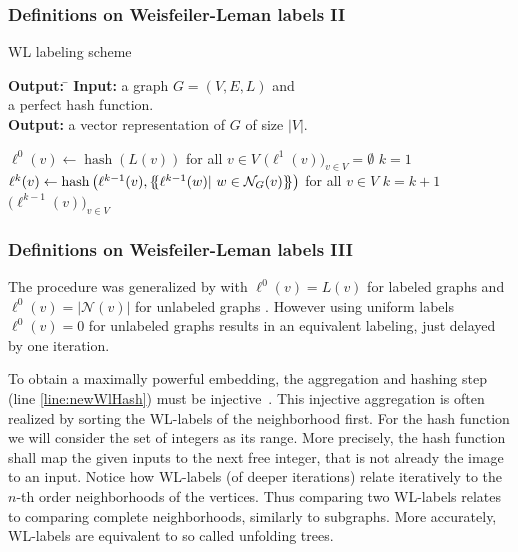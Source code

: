 \begin{frame} \frametitle{Definitions on Weisfeiler-Leman labels II}
	\begin{algorithm}[H] %
		\caption{WL labeling scheme} \label{alg:WLmethod} 
		\begin{tabbing}
			\textbf{Output:} \= \kill
			\textbf{Input:} \>a graph $G=(V, E, L)$ and\\
			\>a perfect hash function.\\		
			\textbf{Output:} \>a vector representation of $G$ of size $|V|$.
		\end{tabbing}	
		\begin{algorithmic}[1]
			\State $\ell^0(v) \leftarrow \operatorname{hash}(L(v))$ for all $v\in V$
			\State $\big(\ell^{1}(v)\big)_{v\in V} = \emptyset$
			\State $k=1$
			\State $\ell^{k}(v) \leftarrow \operatorname{hash}\big(\ell^{k-1}(v), \mset{\ell^{k-1}(w)| \ w\in\mathcal{N}_G(v)} \big)$ for all $v\in V$ \label{line:newWlHash}
			\State $k=k+1$
			\EndWhile		
			\State\Return $\big(\ell^{k-1}(v)\big)_{v\in V}$
		\end{algorithmic}
	\end{algorithm}
\end{frame}

\begin{frame} \frametitle{Definitions on Weisfeiler-Leman labels III}
	The procedure was generalized by \cite{2019_Xu_CONF} with $\ell^0(v) = L(v)$ for labeled graphs and $\ell^0(v) = |\mathcal{N}(v)|$ for unlabeled graphs \cite{2009_Shervashidze_NIPS}.
	However using uniform labels $\ell^0(v) = 0$ for unlabeled graphs results in an equivalent labeling, just delayed by one iteration.
	
	To obtain a maximally powerful embedding, the aggregation and hashing step (line \ref{line:newWlHash}) must be injective~\cite{2019_Xu_CONF}.
	This injective aggregation is often realized by sorting the WL-labels of the neighborhood first.
	For the hash function we will consider the set of integers as its range.
	More precisely, the hash function shall map the given inputs to the next free integer, that is not already the image to an input.
	Notice how WL-labels (of deeper iterations) relate iteratively to the $n$-th order neighborhoods of the vertices.
	Thus comparing two WL-labels relates to comparing complete neighborhoods, similarly to subgraphs.
	More accurately, WL-labels are equivalent to so called unfolding trees.
\end{frame}

